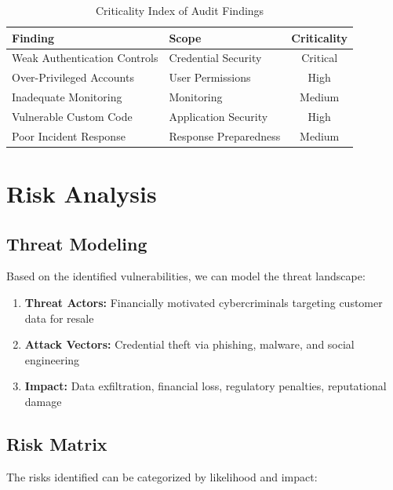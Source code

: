 \documentclass[12pt,a4paper]{article}
\begin{document}
\begin{table}[H]
\caption{Criticality Index of Audit Findings}
\label{tab:findings}
\centering
\begin{tabularx}{\textwidth}{|X|l|c|}
\hline
\rowcolor{primary!20}
\textbf{Finding} & \textbf{Scope} & \textbf{Criticality} \\
\hline
\rowcolor{highlight!20}
Weak Authentication Controls & Credential Security & Critical \\
\rowcolor{highlight!10}
Over-Privileged Accounts & User Permissions & High \\
Inadequate Monitoring & Monitoring & Medium \\
\rowcolor{highlight!10}
Vulnerable Custom Code & Application Security & High \\
Poor Incident Response & Response Preparedness & Medium \\
\hline
\end{tabularx}
\end{table}

\section{Risk Analysis}
\subsection{Threat Modeling}
Based on the identified vulnerabilities, we can model the threat landscape:

\begin{enumerate}
    \item \textbf{Threat Actors:} Financially motivated cybercriminals targeting customer data for resale
    \item \textbf{Attack Vectors:} Credential theft via phishing, malware, and social engineering
    \item \textbf{Impact:} Data exfiltration, financial loss, regulatory penalties, reputational damage
\end{enumerate}

\subsection{Risk Matrix}
The risks identified can be categorized by likelihood and impact:
\end{document}
